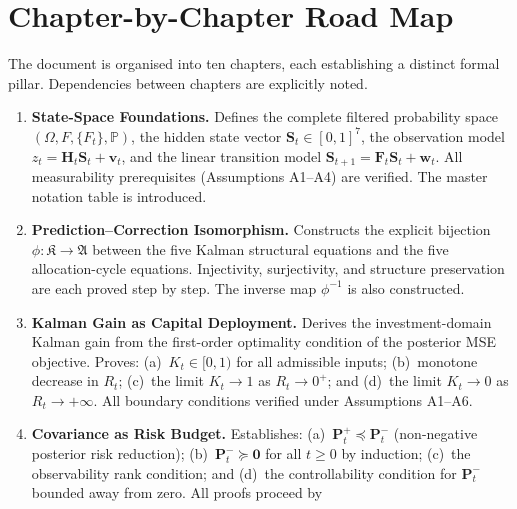 \documentclass[12pt,openany]{book}
\newcommand{\Prob}{\mathbb{P}}
\newcommand{\bfw}{\mathbf{w}}
\newcommand{\bfz}{\mathbf{z}}
\newcommand{\bfF}{\mathbf{F}}
\newcommand{\bfH}{\mathbf{H}}
\newcommand{\bfP}{\mathbf{P}}
\newcommand{\bfv}{\mathbf{v}}
\newcommand{\calF}{\mathcal{F}}
\numberwithin{equation}{chapter}
\theoremstyle{plain}
\theoremstyle{definition}
\theoremstyle{remark}
\def\mathcal#1{#1}%
\def\bfz{z}%
\begin{document}
\section*{Chapter-by-Chapter Road Map}

\noindent
The document is organised into ten chapters, each establishing a
distinct formal pillar.  Dependencies between chapters are
explicitly noted.

\begin{enumerate}[label=\textbf{Ch.~\arabic*.}, leftmargin=3.8em,
                  itemsep=5pt, parsep=0pt, topsep=4pt]
  \item \textbf{State-Space Foundations.}
        Defines the complete filtered probability space
        $(\Omega,\calF,\{\calF_t\},\Prob)$, the hidden state vector
        $\mathbf{S}_t\in[0,1]^7$, the observation model
        $\bfz_t = \bfH_t\mathbf{S}_t + \bfv_t$, and the linear
        transition model
        $\mathbf{S}_{t+1} = \bfF_t\mathbf{S}_t + \bfw_t$.
        All measurability prerequisites (Assumptions A1--A4) are
        verified.  The master notation table is introduced.
  \item \textbf{Prediction--Correction Isomorphism.}
        Constructs the explicit bijection
        $\phi\colon\mathfrak{K}\to\mathfrak{A}$ between the five
        Kalman structural equations and the five allocation-cycle
        equations.  Injectivity, surjectivity, and structure
        preservation are each proved step by step.  The inverse
        map $\phi^{-1}$ is also constructed.
  \item \textbf{Kalman Gain as Capital Deployment.}
        Derives the investment-domain Kalman gain from the
        first-order optimality condition of the posterior MSE
        objective.  Proves: (a)~$K_t\in[0,1)$ for all admissible
        inputs; (b)~monotone decrease in $R_t$; (c)~the limit
        $K_t\to 1$ as $R_t\to 0^+$; and (d)~the limit
        $K_t\to 0$ as $R_t\to+\infty$.  All boundary conditions
        verified under Assumptions A1--A6.
  \item \textbf{Covariance as Risk Budget.}
        Establishes: (a)~$\bfP_t^+\preceq\bfP_t^-$ (non-negative
        posterior risk reduction); (b)~$\bfP_t^-\succeq\mathbf{0}$
        for all $t\geq 0$ by induction; (c)~the observability rank
        condition; and (d)~the controllability condition for
        $\bfP_t^-$ bounded away from zero.  All proofs proceed by

\end{enumerate}
\end{document}
